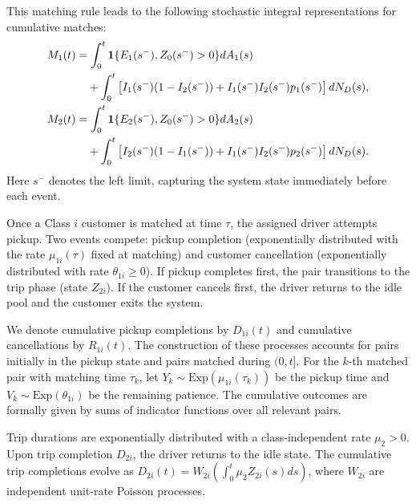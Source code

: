 This matching rule leads to the following stochastic integral representations for cumulative matches:
\begin{align}
M_1(t) &= \int_0^t \mathbf{1}\{E_1(s^-), Z_0(s^-)>0\} dA_1(s) \notag \\
&\quad + \int_0^t \left[ I_1(s^-)(1-I_2(s^-)) + I_1(s^-)I_2(s^-) p_1(s^-) \right] dN_D(s), \label{eq:match_class1} \\
M_2(t) &= \int_0^t \mathbf{1}\{E_2(s^-), Z_0(s^-)>0\} dA_2(s) \notag \\
&\quad + \int_0^t \left[ I_2(s^-)(1-I_1(s^-)) + I_1(s^-)I_2(s^-) p_2(s^-) \right] dN_D(s). \label{eq:match_class2}
\end{align}
Here $s^-$ denotes the left limit, capturing the system state immediately before each event.

Once a Class $i$ customer is matched at time $\tau$, the assigned driver attempts pickup.
Two events compete: pickup completion (exponentially distributed with the rate $\mu_{1i}(\tau)$ fixed at matching) and customer cancellation (exponentially distributed with rate $\theta_{1i} \geq 0$).
If pickup completes first, the pair transitions to the trip phase (state $Z_{2i}$).
If the customer cancels first, the driver returns to the idle pool and the customer exits the system.

We denote cumulative pickup completions by $D_{1i}(t)$ and cumulative cancellations by $R_{1i}(t)$.
The construction of these processes accounts for pairs initially in the pickup state and pairs matched during $(0,t]$.
For the $k$-th matched pair with matching time $\tau_k$, let $Y_k \sim \text{Exp}(\mu_{1i}(\tau_k))$ be the pickup time and $V_k \sim \text{Exp}(\theta_{1i})$ be the remaining patience.
The cumulative outcomes are formally given by sums of indicator functions over all relevant pairs.

Trip durations are exponentially distributed with a class-independent rate $\mu_2 > 0$.
Upon trip completion $D_{2i}$, the driver returns to the idle state.
The cumulative trip completions evolve as $D_{2i}(t) = W_{2i}(\int_0^t \mu_2 Z_{2i}(s) ds)$, where $W_{2i}$ are independent unit-rate Poisson processes.

